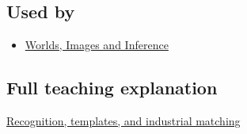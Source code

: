 \subsection{Used by}\label{used-by}

\begin{itemize}
\tightlist
\item
  \href{Continuous\%20Notes/University\%20-\%20Worlds,\%20Images\%20and\%20Inference\%20-\%20Graphics,\%20Vision\%20and\%20Photography}{Worlds, Images and Inference}
\end{itemize}

\subsection{Full teaching explanation}\label{full-teaching-explanation}

\href{Continuous\%20Notes/University\%20-\%20Worlds,\%20Images\%20and\%20Inference\%20-\%20Graphics,\%20Vision\%20and\%20Photography\#Recognition,\%20templates,\%20and\%20industrial\%20matching}{Recognition, templates, and industrial matching}
